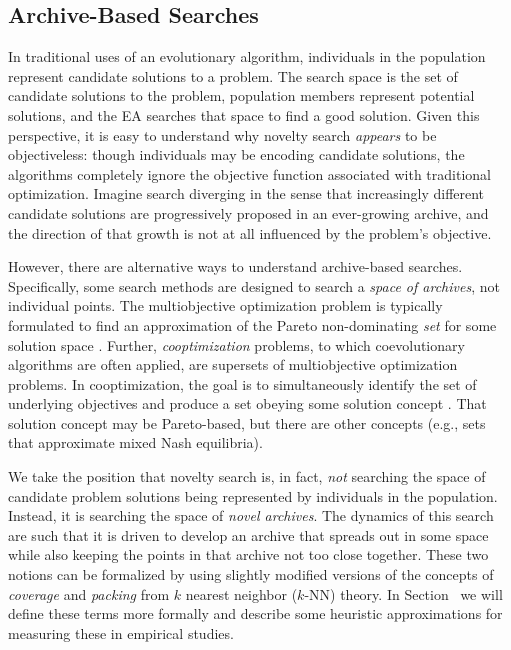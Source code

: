 \documentclass[twoside]{article}
\begin{document}
\subsection{Archive-Based Searches}
\label{subsec:archive}

In traditional uses of an evolutionary algorithm, individuals in the population represent candidate solutions to a problem.  The search space is the set of candidate solutions to the problem, population members represent potential solutions, and the EA searches that space to find a good solution.  Given this perspective, it is easy to understand why novelty search \emph{appears} to be objectiveless:  though individuals may be encoding candidate solutions, the algorithms completely ignore the objective function associated with traditional optimization. Imagine search diverging in the sense that increasingly different candidate solutions are progressively proposed in an ever-growing archive, and the direction of that growth is not at all influenced by the problem's objective.  

However, there are alternative ways to understand archive-based searches.  Specifically, some search methods are designed to search a \emph{space of archives}, not individual points.  The multiobjective optimization problem is typically formulated to find an approximation of the Pareto non-dominating \emph{set} for some solution space \citep{Zitzler2012}.  Further, \emph{cooptimization} problems, to which coevolutionary algorithms are often applied, are supersets of multiobjective optimization problems.  In cooptimization, the goal is to simultaneously identify the set of underlying objectives and produce a set obeying some solution concept \citep{FiciciPollack2001ecal,Ficici2008mpsn}.  That solution concept may be Pareto-based, but there are other concepts (e.g., sets that approximate mixed Nash equilibria).

We take the position that novelty search is, in fact, \emph{not} searching the space of candidate problem solutions being represented by individuals in the population.  Instead, it is searching the space of \emph{novel archives}.  The dynamics of this search are such that it is driven to develop an archive that spreads out in some space while also keeping the points in that archive not too close together.  These two notions can be formalized by using slightly modified versions of the concepts of \emph{coverage} and \emph{packing} from $k$ nearest neighbor ($k$-NN) theory.  In Section~\pageref{subsec:knn} we will define these terms more formally and describe some heuristic approximations for measuring these in empirical studies.
\end{document}
